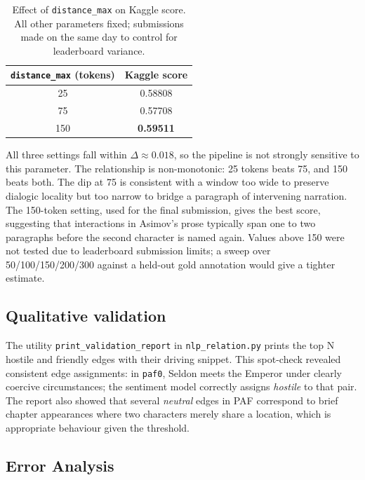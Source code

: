 \documentclass[a4paper]{article}
\begin{document}
\begin{table}[h]
\centering
\caption{Effect of \texttt{distance\_max} on Kaggle score.
All other parameters fixed; submissions made on the same day to
control for leaderboard variance.}
\label{tab:dmax}
\setlength{\tabcolsep}{6pt}
\small
\begin{tabular}{cc}
\toprule
\textbf{\texttt{distance\_max} (tokens)} & \textbf{Kaggle score} \\
\midrule
25  & 0.58808 \\
75  & 0.57708 \\
150 & \textbf{0.59511} \\
\bottomrule
\end{tabular}
\end{table}

All three settings fall within $\Delta \approx 0.018$, so the
pipeline is not strongly sensitive to this parameter. The
relationship is non-monotonic: 25 tokens beats 75, and 150 beats
both. The dip at 75 is consistent with a window too wide to
preserve dialogic locality but too narrow to bridge a paragraph
of intervening narration. The 150-token setting, used for the
final submission, gives the best score, suggesting that
interactions in Asimov's prose typically span one to two
paragraphs before the second character is named again. Values
above 150 were not tested due to leaderboard submission limits;
a sweep over 50/100/150/200/300 against a held-out gold annotation
would give a tighter estimate.

\subsection{Qualitative validation}

The utility \texttt{print\_validation\_report} in \texttt{nlp\_relation.py}
prints the top N hostile and friendly edges with their driving snippet.
This spot-check revealed consistent edge assignments: in \texttt{paf0},
Seldon meets the Emperor under clearly coercive circumstances; the
sentiment model correctly assigns \textit{hostile} to that pair. The report
also showed that several \textit{neutral} edges in PAF correspond to brief
chapter appearances where two characters merely share a location, which is
appropriate behaviour given the threshold.

\subsection{Error Analysis}
\end{document}
